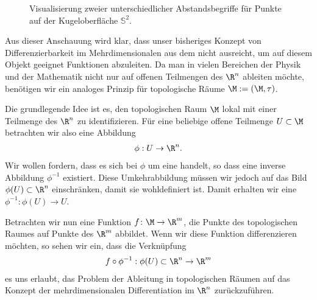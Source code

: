 \documentclass[letterpaper,10pt,german]{jupyterBook}
\let\sphinxpxdimen\pdfpxdimen\else\newdimen\sphinxpxdimen
\begin{document}
\begin{figure}[htbp]
\centering
\capstart

\noindent\sphinxincludegraphics[height=300\sphinxpxdimen]{{mannigfaltigkeit}.png}
\caption{Visualisierung zweier unterschiedlicher Abstandsbegriffe für Punkte auf der Kugeloberfläche \(\mathbb{S}^2\).}\label{\detokenize{manifolds/manifolds_prelim:fig-kugel}}\end{figure}

\sphinxAtStartPar
Aus dieser Anschauung wird klar, dass unser bisheriges Konzept von Differenzierbarkeit im Mehrdimensionalen aus dem  nicht ausreicht, um auf diesem Objekt geeignet Funktionen abzuleiten.
Da man in vielen Bereichen der Physik und der Mathematik nicht nur auf offenen Teilmengen des \(\R^n\) ableiten möchte, benötigen wir ein analoges Prinzip für topologische Räume \(\M := (\M, \tau)\).

\sphinxAtStartPar
{}

\sphinxAtStartPar
Die grundlegende Idee ist es, den topologischen Raum \(\M\) lokal mit einer Teilmenge des \(\R^n\) zu identifizieren.
Für eine beliebige offene Teilmenge \(U\subset \M\) betrachten wir also eine Abbildung
\begin{equation*}
\begin{split}\phi:U\rightarrow \R^n.\end{split}
\end{equation*}
\sphinxAtStartPar
Wir wollen fordern, dass es sich bei \(\phi\) um eine  handelt, so dass eine inverse Abbildung \(\phi^{-1}\) existiert.
Diese Umkehrabbildung müssen wir jedoch auf das Bild \(\phi(U) \subset \R^n\) einschränken, damit sie wohldefiniert ist.
Damit erhalten wir eine  \(\phi^{-1}:\phi(U)\rightarrow U\).

\sphinxAtStartPar
Betrachten wir nun eine Funktion \(f \colon \M \rightarrow \R^m\), die Punkte des topologischen Raumes auf Punkte des \(\R^m\) abbildet.
Wenn wir diese Funktion differenzieren möchten, so sehen wir ein, dass die Verknüpfung
\begin{equation*}
\begin{split}f \circ \phi^{-1} : \phi(U) \subset \R^n \to \R^m\end{split}
\end{equation*}
\sphinxAtStartPar
es uns erlaubt, das Problem der Ableitung in topologischen Räumen auf das Konzept der mehrdimensionalen Differentiation im \(\R^n\) zurückzuführen.
\end{document}
